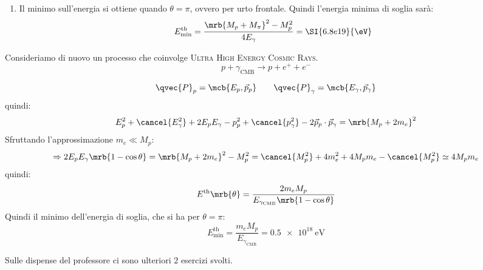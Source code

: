 \begin{example}
\begin{enumerate}
    \item Il minimo sull'energia si ottiene quando $\theta = \pi$, ovvero per
      urto frontale. Quindi l'energia minima di soglia sarà:
      \[
        E _\text{min}^\text{th} = \frac{\mrb{M _{p} + M _{\pi}}^{2} - M _p
        ^{2}}{4 E _{\gamma}} = \SI{6.8e19}{\eV}
      \]
  \end{enumerate}
\end{example}

\begin{example}[UHECR]
  Consideriamo di nuovo un processo che coinvolge \textsc{Ultra High Energy
  Cosmic Rays}.
  \[
    p + \gamma _\text{CMB} \rightarrow p + e^+ + e^-
  \]

  \[
    \qvec{P}_{p} = \mcb{E _{p}, \vec{p}_{p}}
    \qquad
    \qvec{P}_{\gamma} = \mcb{E _{\gamma}, \vec{p}_{\gamma}}
  \]
  quindi:
  \[
    E^2 _{p} + \cancel{E _{\gamma}^{2}} + 2 E _{p} E _{\gamma} - p^2 _{p} +
    \cancel{p ^{2} _{\gamma}} - 2 \vec{p}_{p} \cdot \vec{p}_{\gamma} = \mrb{M
    _{p} + 2 m_e}^{2}
  \]
  Sfruttando l'approssimazione $m _{e} \ll M _{p}$:
  \[
    \Rightarrow 2 E_p E _{\gamma} \mrb{1 - \cos \theta} = \mrb{M _{p} + 2
    m_e}^{2} - M _{p}^{2} = \cancel{M _{p}^{2}} + 4 m _{e}^{2} + 4 M _{p} m_e -
    \cancel{M _{p}^{2}} \simeq 4 M_p m_e
  \]
  quindi:
  \[
    E ^\text{th} \mrb{\theta} = \frac{2 m_e M_p}{E _{\gamma_\text{CMB}} \mrb{1
    - \cos \theta}}
  \]
  Quindi il minimo dell'energia di soglia, che si ha per $\theta = \pi$:
  \[
    E ^\text{th}_\text{min} = \frac{m_e M _{p}}{E _{\gamma _\text{CMB}}} =
    \SI{0.5e18}{\eV}
  \]
\end{example}

\begin{note}[]
  Sulle dispense del professore ci sono ulteriori $2$ esercizi svolti.
\end{note}
